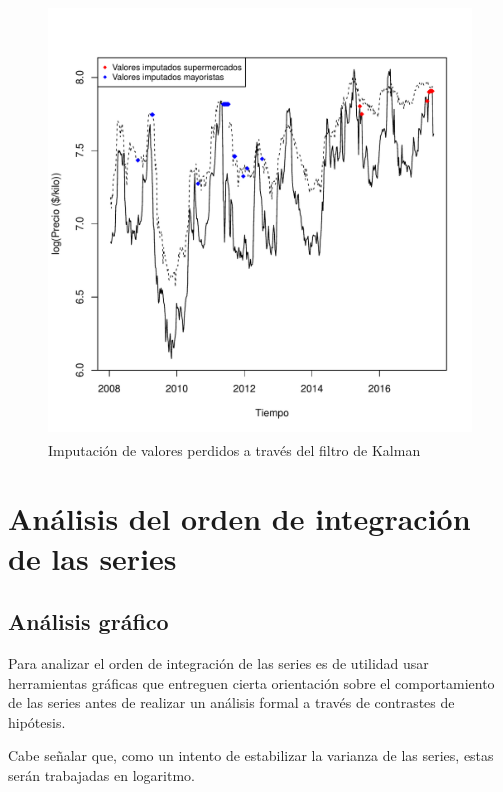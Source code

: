 \documentclass[12pt, twoside]{book}\usepackage[]{graphicx}\usepackage[]{color}
\newenvironment{knitrout}{}{} %
\numberwithin{equation}{section}
\numberwithin{theorem}{section}
\numberwithin{teorema}{section}
\numberwithin{defi}{section}
\numberwithin{prop}{section}
\numberwithin{defi}{section}
\theoremstyle{plain}
\begin{document}
\begin{knitrout}
\color{fgcolor}\begin{figure}[H]

{\centering \includegraphics[width=6.5in,height=4.5in]{figure/fig-3-1} 

}

\caption[Imputación de valores perdidos a través del filtro de Kalman]{Imputación de valores perdidos a través del filtro de Kalman}\label{fig:fig-3}
\end{figure}


\end{knitrout}

\section{Análisis del orden de integración de las series}
\subsection{Análisis gráfico}

Para analizar el orden de integración de las series es de utilidad usar herramientas gráficas que entreguen cierta orientación sobre el comportamiento de las series antes de realizar un análisis formal a través de contrastes de hipótesis. 

Cabe señalar que, como un intento de estabilizar la varianza de las series, estas serán trabajadas en logaritmo.
\end{document}
